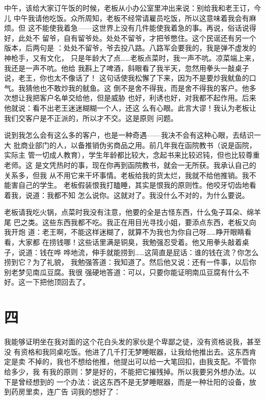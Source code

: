 中午，该给大家订午饭的时候，老板从小办公室里冲出来说：别给我和老王订，今儿
中午我请他吃饭。众所周知，老板不经常请雇员吃饭，所以这意味着我会有麻烦。但
这不能使我着急——这世界上没有几件能使我着急的事。再说，俗话说得好，此处不
留爷，自有留爷处。处处不留爷，才把爷憋住。这个民谣还有另一个版本，后两句是
：处处不留爷，爷去投八路。八路军会要我的，我是弹不虚发的神枪手，又有文化，
只是年龄大了点……老板点菜时，我一声不吭。凉菜端上来，我还是一声不吭。他给
我斟上了啤酒，斜眼看了我半天，忽然用拳头一敲桌子说，老王，你也太不像话了！
这句话使我松懈了下来，因为不是要炒我鱿鱼的口气。我猜他也不敢炒我的鱿鱼。这
倒不是舍不得我，而是舍不得我的客户。他多次想让我把客户名单交给他，但是威胁
也好，利诱也好，对我都不起作用。后来他就说：看不出老王迷迷糊糊一个人，还这
么有心眼。此言大谬！我认为老板让我们交客户是不正派的，所以才不交。这是原则
问题。

说到我怎么会有这么多的客户，也是一种奇遇——我决不会有这种心眼，去结识一大
批商业部门的人，以备推销伪劣商品之用。前几年我在函院教书（说是函院，实际主
管一切成人教育），学生年龄都比较大，念起书来比较迟钝，但也比较尊重老师。这
是文凭热时的事，现在你再到函院教书，就会一无所获。我承认自己的关系多，但我
从不用它来干坏事情。老板给我的货太烂，我就不给他推销。我不能害自己的学生。
老板假装恨我打瞌睡，其实是恨我的原则性。他咬牙切齿地看着我，说道：我都不知
怎么说你。这就对了。我没什么不对的，为什么要说。

老板请我吃火锅，点菜时我没有注意，他要的全是古怪东西，什么兔子耳朵、绵羊尾
巴之类。这些东西我都不吃。我正在用目光寻找小姐，要添点东西，老板又向我开炮
道：老王啊，不能这样迷糊了，就算不为我也为你自己呀……睁开眼睛看看，大家都
在捞钱哪！这些话里满是铜臭，我勉强忍受着。他又用拳头敲着桌子，说道：钱在哗
哗地流，伸手就能捞到……这简直是屁话：谁的钱在流？你怎么捞到它？为了礼貌，
我勉强答道：我知道了。然后他又说：还有一件事，以后你别老梦见南瓜豆腐。我很
强硬地答道：可以，只要你能证明南瓜豆腐有什么不好。这一下把他顶回去了。

\section{四}

我能够证明坐在我对面的这个花白头发的家伙是个卑鄙之徒，没有资格说我，甚至没
有资格和我同桌吃饭。他进了几千打无梦睡眠器，让我给他推出去。这东西肯定是卖
不掉的，我也不想给他推，他提出可以给一大笔回扣，由我支配。不管你给多少，我
有我的原则：梦是好的，不能把它摧残掉。所以我要另外想办法。以下是曾经想到的
一个办法：说这东西不是无梦睡眠器，而是一种壮阳的设备，放到药房里卖，连广告
词我的想好了：

